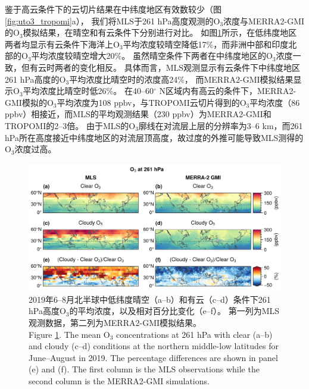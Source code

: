 鉴于高云条件下的云切片结果在中纬度地区有效数较少（图\ref{fig:uto3_tropomi}a），
我们将MLS于261 hPa高度观测的O$_3$浓度与MERRA2-GMI的O$_3$模拟结果，在晴空和有云条件下分别进行对比。
如图\ref{fig:mls_o3_261hpa}所示，在低纬度地区两者均显示有云条件下海洋上O$_3$平均浓度较晴空降低17\%，而非洲中部和印度北部的O$_3$平均浓度较晴空增大20\%。
虽然晴空条件下两者在中纬度地区的O$_3$浓度一致，但有云时两者的变化相反。
具体而言，MLS观测显示有云条件下中纬度地区261 hPa高度的O$_3$平均浓度比晴空时的浓度高24\%，
而MERRA2-GMI模拟结果显示O$_3$平均浓度比晴空时低26\%。
在40--60$^{\circ}$ N区域内有高云的条件下，MERRA2-GMI模拟的O$_3$平均浓度为108 ppbv，与TROPOMI云切片得到的O$_3$平均浓度（86 ppbv）相接近，而MLS的平均观测结果（230 ppbv）为MERRA2-GMI和TROPOMI的2--3倍。
由于MLS的O$_3$廓线在对流层上层的分辨率为3--6 km，而261 hPa所在高度接近中纬度地区的对流层顶高度，故过度的外推可能导致MLS测得的O$_3$浓度过高\citep{Schoeberl.2007}。


\begin{figure}[H]
    \centering
    \includegraphics[width=\textwidth]{./figures/mls_o3_261hpa.png}
    \caption{
    2019年6--8月北半球中低纬度晴空（a--b）和有云（c--d）条件下261 hPa高度O$_3$的平均浓度，以及相对百分比变化（e--f）。
    第一列为MLS观测数据，第二列为MERRA2-GMI模拟结果。 \\
    Figure \ref{fig:mls_o3_261hpa}. The mean O$_3$ concentrations at 261 hPa with clear (a--b) and cloudy (c--d) conditions at the northern middle-low latitudes for June--August in 2019. The percentage differences are shown in panel (e) and (f).
    The first column is the MLS observations while the second column is the MERRA2-GMI simulations.
    }
    \label{fig:mls_o3_261hpa}
\end{figure}


